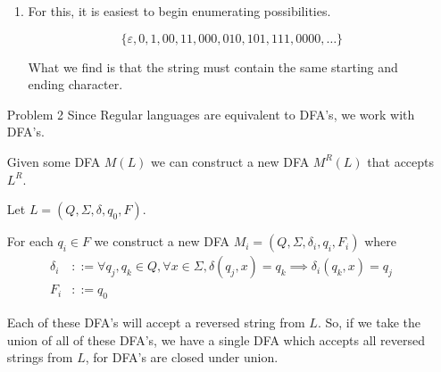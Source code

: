 \documentclass[12pt,letterpaper]{article}
\begin{document}
\begin{enumerate}
\begin{enumerate}
        \item
          For this, it is easiest to begin enumerating possibilities.

          \[\{\varepsilon , 0, 1, 00, 11, 000, 010, 101, 111, 0000, \dots\}\]

          What we find is that the string must contain the same starting and ending character.

      \end{enumerate}

    \item[Problem 2]
      Since Regular languages are equivalent to DFA's, we work with DFA's.

      Given some DFA $M(L)$ we can construct a new DFA $M^R(L)$ that accepts $L^R$.

      Let $L = (Q, \Sigma, \delta, q_0, F)$.

      For each $q_i \in F$ we construct a new DFA $M_i = (Q, \Sigma, \delta_i, q_i, F_i)$
      where
      \begin{align*}
        \delta_i &::= \forall q_j, q_k \in Q, \forall x \in \Sigma, \delta(q_j, x) = q_k \implies \delta_i(q_k, x) = q_j \\
        F_i &::= {q_0}
      \end{align*}

      Each of these DFA's will accept a reversed string from $L$.
      So, if we take the union of all of these DFA's,
      we have a single DFA which accepts all reversed strings from $L$, for DFA's are closed under union.
  \end{enumerate}
\end{document}
